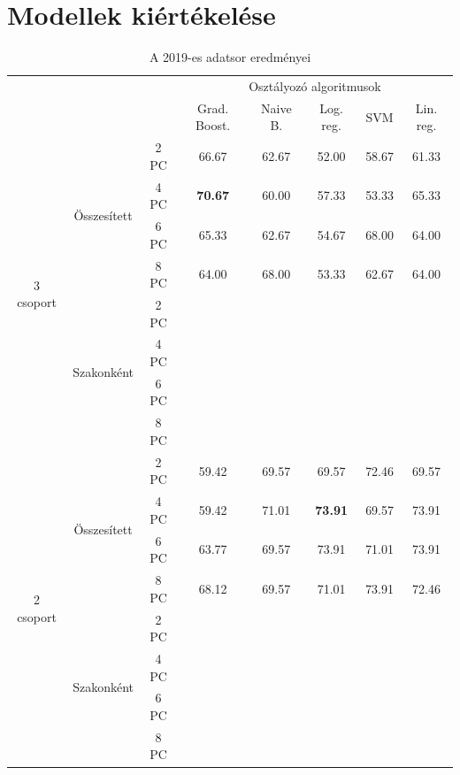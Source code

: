 \documentclass[12pt]{article}
\begin{document}
\section{Modellek kiértékelése}

\begin{table}[H]
\centering
\begin{tabular}{ccc|ccccc}

    &&&\multicolumn{5}{c}{Osztályozó algoritmusok} \\
    &&& Grad. Boost. &  Naive B. & Log. reg.  &  SVM & Lin. reg. \\ 
        \hline
    \multirow{8}{*}{3 csoport}& \multirow{4}{*}{Összesített}&2 PC&66.67&62.67&52.00&58.67&61.33 \\
    												&&4 PC&\textbf{70.67}&60.00&57.33&53.33&65.33\\
    												&&6 PC&65.33&62.67&54.67&68.00&64.00\\
    												&&8 PC&64.00&68.00&53.33&62.67&64.00\\\cline{3-8}%
    						& \multirow{4}{*}{Szakonként}&2 PC&&&&& \\
    												&&4 PC&&&&&\\
    												&&6 PC&&&&&\\
    												&&8 PC&&&&&\\
    						 
    \hline
    \hline
    \multirow{8}{*}{2 csoport}& \multirow{4}{*}{Összesített}&2 PC&59.42&69.57&69.57&72.46&69.57\\
    												&&4 PC&59.42&71.01&\textbf{73.91}&69.57&73.91\\
    												&&6 PC&63.77&69.57&73.91&71.01&73.91\\
    												&&8 PC&68.12&69.57&71.01&73.91&72.46\\\cline{3-8}
    						 & \multirow{4}{*}{Szakonként}&2 PC&&&&&\\
    												&&4 PC&&&&&\\
    												&&6 PC&&&&&\\
    												&&8 PC&&&&&\\
    												\hline
\end{tabular}
\caption{A 2019-es adatsor eredményei}
\label{tab:multicol1}
\end{table}
\end{document}
